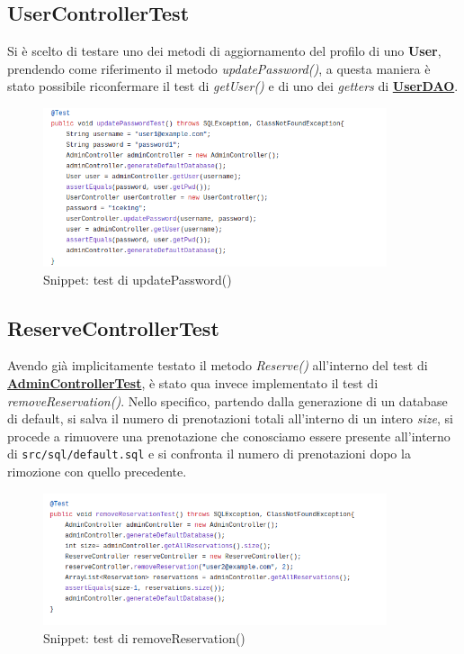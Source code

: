 \documentclass{article}
\begin{document}
{\subsection{UserControllerTest}\label{subsection:usercontrollertest}
Si è scelto di testare uno dei metodi di aggiornamento del profilo di uno \textbf{User}, prendendo come riferimento il metodo \textit{updatePassword()}, a questa maniera è stato possibile riconfermare il test di \textit{getUser()} e di uno dei \textit{getters} di \hyperref[subsubsec:userDAO]{\textbf{UserDAO}}.
\begin{figure}[H]
                \centering
                \includegraphics[width=0.9\textwidth]{Images/Snippets/updatePasswordTest.png}
                \captionsetup{labelformat=empty,labelsep=none}
                \caption{Snippet: test di updatePassword()}
                \label{fig:Usercontrollertest}
            \end{figure}
\subsection{ReserveControllerTest}\label{subsection:reservecontrollertest}
Avendo già implicitamente testato il metodo \textit{Reserve()} all'interno del test di \hyperref[fig:Admincontrollertestsnippets]{\textbf{AdminControllerTest}}, è stato qua invece implementato il test di \textit{removeReservation()}. Nello specifico, partendo dalla generazione di un database di default, si salva il numero di prenotazioni totali all'interno di un intero \textit{size}, si procede a rimuovere una prenotazione che conosciamo essere presente all'interno di \texttt{src/sql/default.sql} e si confronta il numero di prenotazioni dopo la rimozione con quello precedente.
\begin{figure}[H]
                \centering
                \includegraphics[width=0.9\textwidth]{Images/Snippets/removeReservationTest.png}
                \captionsetup{labelformat=empty,labelsep=none}
                \caption{Snippet: test di removeReservation()}
                \label{fig:ReserveControllerTest}
            \end{figure}
}
\end{document}
